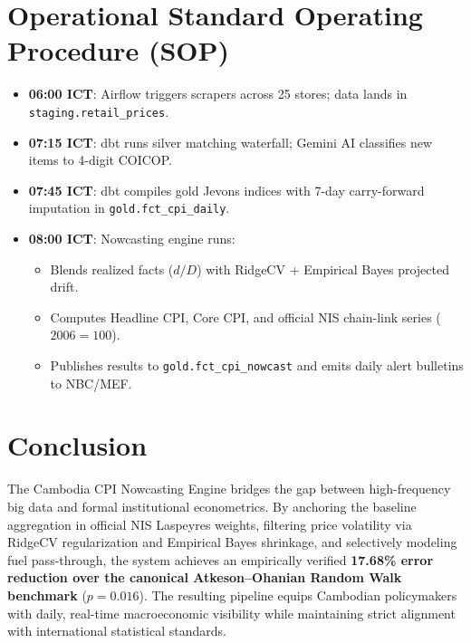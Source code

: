 \documentclass[a4paper, 11pt]{article}
\begin{document}
\section{Operational Standard Operating Procedure (SOP)}
\label{sec:operational_blueprint}
\begin{tcolorbox}[title=Executive Production SOP \& Audit Checklist]
\begin{itemize}[noitemsep]
    \item \textbf{06:00 ICT}: Airflow triggers scrapers across 25 stores; data lands in \texttt{staging.retail\_prices}.
    \item \textbf{07:15 ICT}: dbt runs silver matching waterfall; Gemini AI classifies new items to 4-digit COICOP.
    \item \textbf{07:45 ICT}: dbt compiles gold Jevons indices with 7-day carry-forward imputation in \texttt{gold.fct\_cpi\_daily}.
    \item \textbf{08:00 ICT}: Nowcasting engine runs:
    \begin{itemize}[noitemsep]
        \item Blends realized facts ($d/D$) with RidgeCV + Empirical Bayes projected drift.
        \item Computes Headline CPI, Core CPI, and official NIS chain-link series ($2006=100$).
        \item Publishes results to \texttt{gold.fct\_cpi\_nowcast} and emits daily alert bulletins to NBC/MEF.
    \end{itemize}
\end{itemize}
\end{tcolorbox}

\section{Conclusion}
The Cambodia CPI Nowcasting Engine bridges the gap between high-frequency big data and formal institutional econometrics. By anchoring the baseline aggregation in official NIS Laspeyres weights, filtering price volatility via RidgeCV regularization and Empirical Bayes shrinkage, and selectively modeling fuel pass-through, the system achieves an empirically verified \textbf{17.68\% error reduction over the canonical Atkeson--Ohanian Random Walk benchmark} ($p = 0.016$). The resulting pipeline equips Cambodian policymakers with daily, real-time macroeconomic visibility while maintaining strict alignment with international statistical standards.
\end{document}

